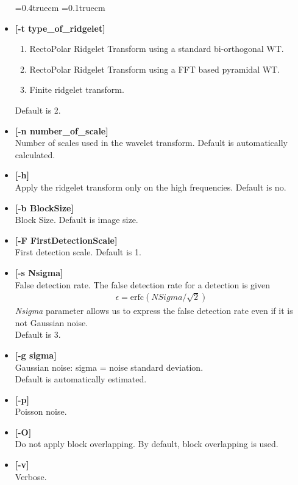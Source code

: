 \begin{itemize}
\baselineskip=0.4truecm
\itemsep=0.1truecm
\item {\bf [-t type\_of\_ridgelet]}  
\begin{enumerate}
\baselineskip=0.4truecm
\itemsep=0.1truecm
\item RectoPolar Ridgelet Transform using a standard bi-orthogonal WT.
\item RectoPolar Ridgelet Transform using a FFT based pyramidal WT.
\item Finite ridgelet transform.
\end{enumerate}
Default is 2.
\item {\bf [-n number\_of\_scale]} \\
 Number of scales used in the wavelet transform.
 Default is automatically calculated.
\item {\bf [-h]} \\
Apply the ridgelet transform only on the high frequencies.
Default is no.

\item {\bf [-b BlockSize]} \\
Block Size. Default is image size.

\item {\bf [-F FirstDetectionScale]} \\
 First detection scale. Default is 1. 


\item {\bf [-s Nsigma]} \\
False detection rate. The false detection rate for a detection is given
\begin{eqnarray}
\epsilon =  \mbox{erfc}( NSigma / \sqrt{2})
\end{eqnarray}
{\em Nsigma} parameter allows us to express the false detection rate
even if it is not Gaussian noise. \\
Default is 3.

\item {\bf [-g sigma]} \\
Gaussian noise: sigma = noise standard deviation.  \\
 Default is automatically estimated.

\item {\bf [-p]} \\
Poisson noise.

\item {\bf [-O]}  \\
Do not apply block overlapping. By default, block overlapping is used.

\item {\bf [-v]} \\
Verbose.
\end{itemize}
